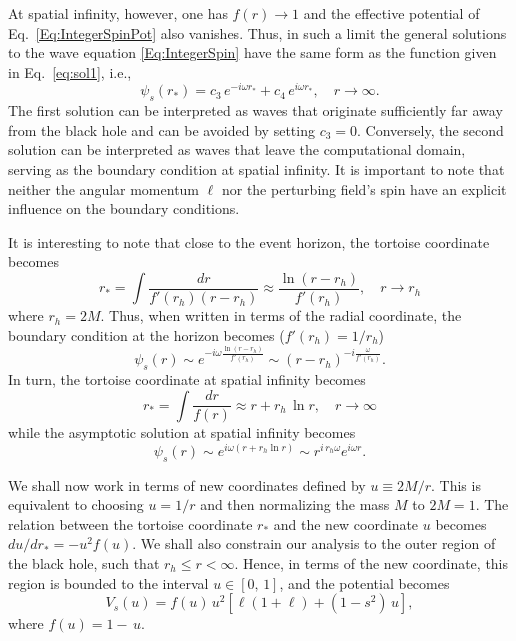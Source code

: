 At spatial infinity, however, one has $f(r)\to 1$ and the effective potential of Eq.~\eqref{Eq:IntegerSpinPot} also vanishes. Thus, in such a limit the general solutions to the wave equation \eqref{Eq:IntegerSpin} have the same form as the function given in Eq.~\eqref{eq:sol1}, i.e.,
%
\begin{equation}
  \psi_{s}(r_*)=c_3\, e^{-i\omega r_*}+c_4\, e^{i\omega r_*}, \quad r\to \infty.
\end{equation}
%
The first solution can be interpreted as waves that originate sufficiently far away from the black hole and can be avoided by setting $c_3=0$. Conversely, the second solution can be interpreted as waves that leave the computational domain, serving as the boundary condition at spatial infinity. It is important to note that neither the angular momentum $\ell$ nor the perturbing field's spin have an explicit influence on the boundary conditions.

It is interesting to note that close to the event horizon, the tortoise coordinate becomes
%
\begin{equation}
  r_*=\int \frac{dr}{f'(r_h)(r-r_h)}\approx \frac{\ln{(r-r_h)}}{ f'(r_h)},\quad r\to r_h
\end{equation}
where $r_h=2M$.
Thus, when written in terms of the radial coordinate, the boundary condition at the horizon becomes ($f'(r_h)=1/r_h$)
%
\begin{equation}
  \psi_s(r)\sim e^{-i\omega \frac{\ln{(r-r_h)}}{f'(r_h)}}\sim \left(r-r_h\right)^{-i\frac{\omega}{f'(r_h)}}.
\end{equation}
%
In turn, the tortoise coordinate at spatial infinity becomes
%
\begin{equation}
  r_*=\int \frac{dr}{f(r)}\approx r+r_h\,\ln{r},\quad r\to \infty
\end{equation}
%
while the asymptotic solution at spatial infinity becomes
%
\begin{equation}
  \psi_s(r)\sim e^{i\omega(r+ r_h \ln{r})}\sim r^{i\, r_h\omega}e^{i\omega r}.
\end{equation}

We shall now work in terms of new coordinates defined by $u\equiv2M/r$. This is equivalent to choosing $u=1/r$ and then normalizing the mass $M$ to $2M=1$. The relation between the tortoise coordinate $r_*$ and the new coordinate $u$  becomes $du/dr_*=-u^2f(u)$. We shall also constrain our analysis to the outer region of the black hole, such that $r_h\leq r<\infty$. Hence, in terms of the new coordinate, this region is bounded to the interval $u\in [0,\, 1]$, and the potential becomes
%
\begin{equation}
  V_{s}(u)=f(u)\,u^2\left[\ell\left(1+\ell\right)+\left(1-s^2\right)\,u\right],
\end{equation}
%
where $f(u) = 1- \,u$.


